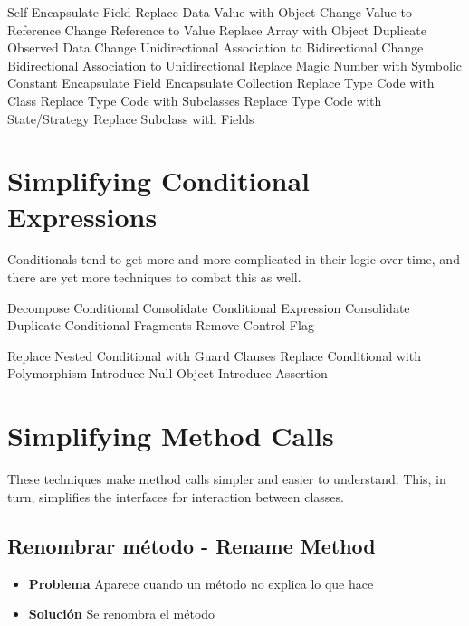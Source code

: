 \documentclass[11pt,a4paper,oneside]{book}
\begin{document}
    Self Encapsulate Field
    Replace Data Value with Object
    Change Value to Reference
    Change Reference to Value
    Replace Array with Object
    Duplicate Observed Data
    Change Unidirectional Association to Bidirectional
    Change Bidirectional Association to Unidirectional
    Replace Magic Number with Symbolic Constant
    Encapsulate Field
    Encapsulate Collection
    Replace Type Code with Class
    Replace Type Code with Subclasses
    Replace Type Code with State/Strategy
    Replace Subclass with Fields




\section{Simplifying Conditional Expressions}

Conditionals tend to get more and more complicated in their logic over time, and there are yet more techniques to combat this as well.

    Decompose Conditional
    Consolidate Conditional Expression
    Consolidate Duplicate Conditional Fragments
    Remove Control Flag

    Replace Nested Conditional with Guard Clauses
    Replace Conditional with Polymorphism
    Introduce Null Object
    Introduce Assertion




\section{Simplifying Method Calls}

These techniques make method calls simpler and easier to understand. This, in turn, simplifies the interfaces for interaction between classes.

\subsection{     Renombrar método - Rename Method}
\label{renombrarmetodo}
\begin{itemize}
    \item \textbf{Problema} Aparece cuando un método no explica lo que hace 
    \item \textbf{Solución} Se renombra el método
\end{itemize}
    
%

     
    
\end{document}
